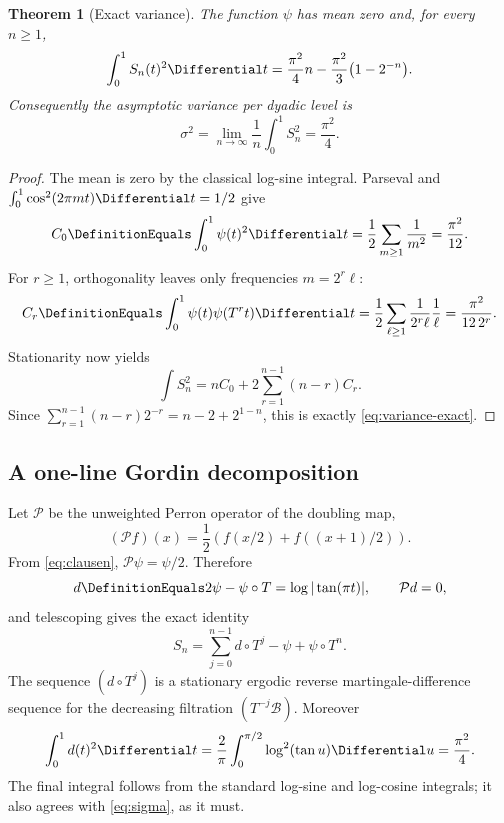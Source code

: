 \documentclass[11pt,oneside]{article}
\numberwithin{equation}{section}
\newtheorem{theorem}{Theorem}[section]
\theoremstyle{definition}
\theoremstyle{remark}
\begin{document}
\begin{theorem}[Exact variance]
\label{thm:exact-variance}
The function $\psi$ has mean zero and, for every $n\ge1$,
\begin{equation}
 \int_0^1 S_n(t)^2\Differential t
 =\frac{\pi^2}{4}n-\frac{\pi^2}{3}\bigl(1-2^{-n}\bigr).
 \label{eq:variance-exact}
\end{equation}
Consequently the asymptotic variance per dyadic level is
\begin{equation}
 \sigma^2=\lim_{n\to\infty}\frac1n\int_0^1S_n^2=\frac{\pi^2}{4}.
 \label{eq:sigma}
\end{equation}
\end{theorem}

\begin{proof}
The mean is zero by the classical log-sine integral.  Parseval and
$\int_0^1\cos^2(2\pi mt)\Differential t=1/2$ give
\[
 C_0\DefinitionEquals\int_0^1\psi(t)^2\Differential t
 =\frac12\sum_{m\ge1}\frac1{m^2}=\frac{\pi^2}{12}.
\]
For $r\ge1$, orthogonality leaves only frequencies $m=2^r\ell$:
\[
 C_r\DefinitionEquals\int_0^1\psi(t)\psi(T^rt)\Differential t
 =\frac12\sum_{\ell\ge1}\frac1{2^r\ell}\frac1\ell
 =\frac{\pi^2}{12\,2^r}.
\]
Stationarity now yields
\[
 \int S_n^2=nC_0+2\sum_{r=1}^{n-1}(n-r)C_r.
\]
Since $\sum_{r=1}^{n-1}(n-r)2^{-r}=n-2+2^{1-n}$, this is exactly
\eqref{eq:variance-exact}.
\end{proof}

\subsection{A one-line Gordin decomposition}

Let $\mathcal P$ be the unweighted Perron operator of the doubling map,
\[
 (\mathcal P f)(x)=\frac12\left(f(x/2)+f((x+1)/2)\right).
\]
From \eqref{eq:clausen}, $\mathcal P\psi=\psi/2$.  Therefore
\begin{equation}
 d\DefinitionEquals2\psi-\psi\circ T=\log|\tan(\pi t)|,
 \qquad \mathcal P d=0,
 \label{eq:martingale-difference}
\end{equation}
and telescoping gives the exact identity
\begin{equation}
 S_n=\sum_{j=0}^{n-1}d\circ T^j-\psi+\psi\circ T^n.
 \label{eq:Gordin-exact}
\end{equation}
The sequence $(d\circ T^j)$ is a stationary ergodic reverse martingale-difference sequence
for the decreasing filtration $(T^{-j}\mathcal B)$.  Moreover
\begin{equation}
 \int_0^1d(t)^2\Differential t
 =\frac2\pi\int_0^{\pi/2}\log^2(\tan u)\Differential u
 =\frac{\pi^2}{4}.
 \label{eq:d-variance}
\end{equation}
The final integral follows from the standard log-sine and log-cosine integrals; it also
agrees with \eqref{eq:sigma}, as it must.
\end{document}
